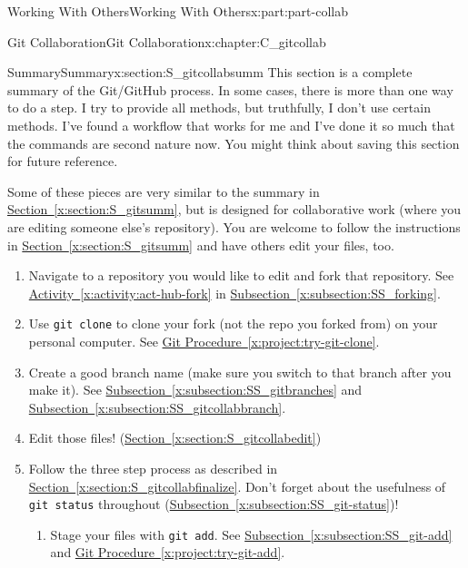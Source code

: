 \documentclass[oneside,10pt,]{book}
\newcommand{\xreffont}{\relax}
\newcommand{\mono}[1]{\texttt{#1}}
\begin{document}
\begin{partptx}{Working With Others}{}{Working With Others}{}{}{x:part:part-collab}
\begin{chapterptx}{Git Collaboration}{}{Git Collaboration}{}{}{x:chapter:C_gitcollab}
\typeout{************************************************}
%
\begin{sectionptx}{Summary}{}{Summary}{}{}{x:section:S_gitcollabsumm}
%
This section is a complete summary of the Git\slash{}GitHub process. In some cases, there is more than one way to do a step. I try to provide all methods, but truthfully, I don't use certain methods. I've found a workflow that works for me and I've done it so much that the commands are second nature now. You might think about saving this section for future reference.%
\par
Some of these pieces are very similar to the summary in \hyperref[x:section:S_gitsumm]{Section~{\xreffont\ref{x:section:S_gitsumm}}}, but is designed for collaborative work (where you are editing someone else's repository). You are welcome to follow the instructions in \hyperref[x:section:S_gitsumm]{Section~{\xreffont\ref{x:section:S_gitsumm}}} and have others edit your files, too.%
\begin{enumerate}
\item{}Navigate to a repository you would like to edit and fork that repository. See \hyperref[x:activity:act-hub-fork]{Activity~{\xreffont\ref{x:activity:act-hub-fork}}} in \hyperref[x:subsection:SS_forking]{Subsection~{\xreffont\ref{x:subsection:SS_forking}}}.%
\item{}Use \mono{git clone} to clone your fork (not the repo you forked from) on your personal computer. See \hyperref[x:project:try-git-clone]{Git Procedure~{\xreffont\ref{x:project:try-git-clone}}}.%
\item{}Create a good branch name (make sure you switch to that branch after you make it). See \hyperref[x:subsection:SS_gitbranches]{Subsection~{\xreffont\ref{x:subsection:SS_gitbranches}}} and \hyperref[x:subsection:SS_gitcollabbranch]{Subsection~{\xreffont\ref{x:subsection:SS_gitcollabbranch}}}.%
\item{}Edit those files! (\hyperref[x:section:S_gitcollabedit]{Section~{\xreffont\ref{x:section:S_gitcollabedit}}})%
\item{}Follow the three step process as described in \hyperref[x:section:S_gitcollabfinalize]{Section~{\xreffont\ref{x:section:S_gitcollabfinalize}}}. Don't forget about the usefulness of \mono{git status} throughout (\hyperref[x:subsection:SS_git-status]{Subsection~{\xreffont\ref{x:subsection:SS_git-status}}})!%
\begin{enumerate}
\item{}Stage your files with \mono{git add}. See \hyperref[x:subsection:SS_git-add]{Subsection~{\xreffont\ref{x:subsection:SS_git-add}}} and \hyperref[x:project:try-git-add]{Git Procedure~{\xreffont\ref{x:project:try-git-add}}}.%

\end{enumerate}
\end{enumerate}
\end{sectionptx}
\end{chapterptx}
\end{partptx}
\end{document}
